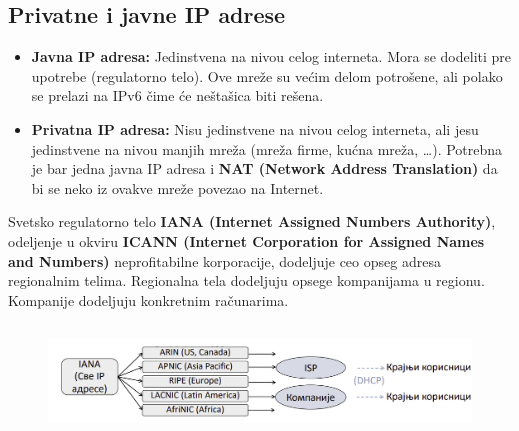 \documentclass[a4paper]{article}
\begin{document}
    \subsection{Privatne i javne IP adrese}
        \begin{itemize}
            \item \textbf{Javna IP adresa:} Jedinstvena na nivou celog interneta. Mora se dodeliti
                  pre upotrebe (regulatorno telo). Ove mreže su većim delom potrošene, ali 
                  polako se prelazi na IPv6 čime će neštašica biti rešena.
            \item \textbf{Privatna IP adresa:} Nisu jedinstvene na nivou celog interneta, ali
                  jesu jedinstvene na nivou manjih mreža (mreža firme, kućna mreža, \dots).
                  Potrebna je bar jedna javna IP adresa i \textbf{NAT (Network Address Translation)} da bi
                  se neko iz ovakve mreže povezao na Internet.
        \end{itemize}

        Svetsko regulatorno telo \textbf{IANA (Internet Assigned Numbers Authority)}, odeljenje u okviru
        \textbf{ICANN (Internet Corporation for Assigned Names and Numbers)} neprofitabilne korporacije,
        dodeljuje ceo opseg adresa regionalnim telima. Regionalna tela dodeljuju opsege 
        kompanijama u regionu. Kompanije dodeljuju konkretnim računarima. 
        \begin{figure}[H]
            \begin{center}
                \includegraphics[width=120mm,height=30mm]{Slike/iana.png}
            \end{center}
        \end{figure}
\end{document}

